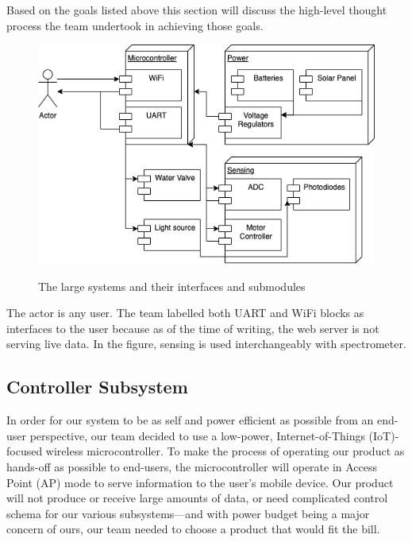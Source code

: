 \documentclass[journal]{IEEEtran}
\begin{document}
Based on the goals listed above this section will discuss the high-level thought
process the team undertook in achieving those goals.
\begin{figure}[H]
    \centering
    \includegraphics[width=\linewidth]{images/Flowchart.png}
    \label{fig:flowchart}
    \caption{The large systems and their interfaces and submodules}
\end{figure}
The actor is any user. The team labelled both UART and WiFi blocks as interfaces to the user
because as of the time of writing, the web server is not serving live data. In the figure, sensing is used 
interchangeably with spectrometer.
\subsection{Controller Subsystem}

In order for our system to be as self and power efficient as possible from an end-user perspective, our 
team decided to use a low-power, Internet-of-Things (IoT)-focused wireless microcontroller. To make the 
process of operating our product as hands-off as possible to end-users, the microcontroller will operate 
in Access Point (AP) mode to serve information to the user's mobile device. Our product will not produce 
or receive large amounts of data, or need complicated control schema for our various subsystems---and with 
power budget being a major concern of ours, our team needed to choose a product that would fit the bill.
\end{document}
